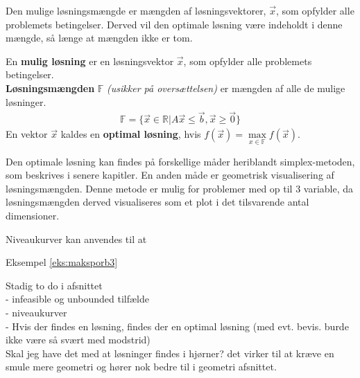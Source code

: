 Den mulige løsningsmængde er mængden af løsningsvektorer, $\vec{x}$, som opfylder alle problemets betingelser. Derved vil den optimale løsning være indeholdt i denne mængde, så længe at mængden ikke er tom.

\begin{defn}
En \textbf{mulig løsning} er en løsningsvektor $\vec{x}$, som opfylder alle problemets betingelser.\\
\textbf{Løsningsmængden} $\mathds{F}$ \textit{(usikker på oversættelsen)} er mængden af alle de mulige løsninger.
\begin{align*}
\mathds{F}=\{\vec{x} \in \mathds{R}|A\vec{x} \leq \vec{b}, \vec{x} \geq \vec{0}\}
\end{align*}
En vektor $\vec{x}$ kaldes en \textbf{optimal løsning}, hvis $f(\vec{x})=\max\limits_{x \in \mathds{F}}f(\vec{x}).$
\end{defn}

Den optimale løsning kan findes på forskellige måder heriblandt simplex-metoden, som beskrives i senere kapitler. En anden måde er geometrisk visualisering af løsningsmængden. Denne metode er mulig for problemer med op til 3 variable, da løsningsmængden derved visualiseres som et plot i det tilsvarende antal dimensioner.

Niveaukurver kan anvendes til at 

Eksempel \ref{eks:maksporb3}


\begin{eks}
	\begin{center}	
		
		\label{eks:maksprob3}
	\end{center}

\end{eks}


Stadig to do i afsnittet\\
- infeasible og unbounded tilfælde\\
- niveaukurver\\
- Hvis der findes en løsning, findes der en optimal løsning (med evt. bevis. burde ikke være så svært med modstrid)\\

Skal jeg have det med at løsninger findes i hjørner? det virker til at kræve en smule mere geometri og hører nok bedre til i geometri afsnittet.




